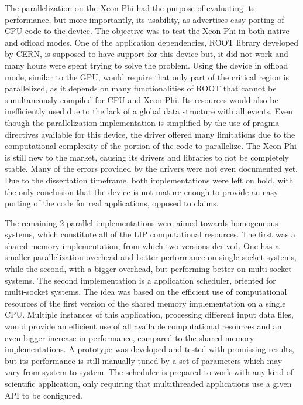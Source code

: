 The parallelization on the \intel Xeon Phi had the purpose of evaluating its performance, but more importantly, its usability, as \intel advertises easy porting of CPU code to the device. The objective was to test the Xeon Phi in both native and offload modes. One of the application dependencies, ROOT library developed by CERN, is supposed to have support for this device but, it did not work and many hours were spent trying to solve the problem. Using the device in offload mode, similar to the GPU, would require that only part of the critical region is parallelized, as it depends on many functionalities of ROOT that cannot be simultaneously compiled for CPU and Xeon Phi. Its resources would also be inefficiently used due to the lack of a global data structure with all events. Even though the parallelization implementation is simplified by the use of pragma directives available for this device, the driver offered many limitations due to the computational complexity of the portion of the code to parallelize. The Xeon Phi is still new to the market, causing its drivers and libraries to not be completely stable. Many of the errors provided by the drivers were not even documented yet. Due to the dissertation timeframe, both implementations were left on hold, with the only conclusion that the device is not mature enough to provide an easy porting of the code for real applications, opposed to \intel claims.

The remaining 2 parallel implementations were aimed towards homogeneous systems, which constitute all of the LIP computational resources. The first was a shared memory implementation, from which two versions derived. One has a smaller parallelization overhead and better performance on single-socket systems, while the second, with a bigger overhead, but performing better on multi-socket systems. The second implementation is a application scheduler, oriented for multi-socket systems. The idea was based on the efficient use of computational resources of the first version of the shared memory implementation on a single CPU. Multiple instances of this application, processing different input data files, would provide an efficient use of all available computational resources and an even bigger increase in performance, compared to the shared memory implementations. A prototype was developed and tested with promissing results, but its performance is still manually tuned by a set of parameters which may vary from system to system. The scheduler is prepared to work with any kind of scientific application, only requiring that multithreaded applications use a given API to be configured.

